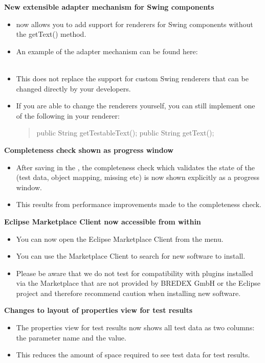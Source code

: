 \textbf{New extensible adapter mechanism for Swing components}\\
\begin{itemize}
\item \app{} now allows you to add support for renderers for Swing components without the getText() method.
\item An example of the adapter mechanism can be found here:\\
\\
\item This does not replace the support for custom Swing renderers that can be changed directly by your developers. 
\item If you are able to change the renderers yourself, you can still implement one of the following in your renderer:
\begin{quote}
public String getTestableText();
public String getText();
\end{quote}
\end{itemize}

\textbf{Completeness check shown as progress window}\\
\begin{itemize}
\item After saving in the \ite{}, the completeness check which validates the state of the \gdproject{} (test data, object mapping, missing \gdcases{} etc) is now shown explicitly as a progress window.
\item This results from performance improvements made to the completeness check.
\end{itemize} 

\textbf{Eclipse Marketplace Client now accessible from within \app{}}
\begin{itemize}
\item You can now open the Eclipse Marketplace Client from the  menu.
\item You can use the Marketplace Client to search for new software to install. 
\item Please be aware that we do not test \app{} for compatibility with plugins installed via the Marketplace that are not provided by BREDEX GmbH or the Eclipse \jb{} project and therefore recommend caution when installing new software. 
\end{itemize}

\textbf{Changes to layout of properties view for test results}\\
\begin{itemize}
\item The properties view for test results now shows all test data as two columns: the parameter name and the value.
\item This reduces the amount of space required to see test data for test results. 
\end{itemize} 


